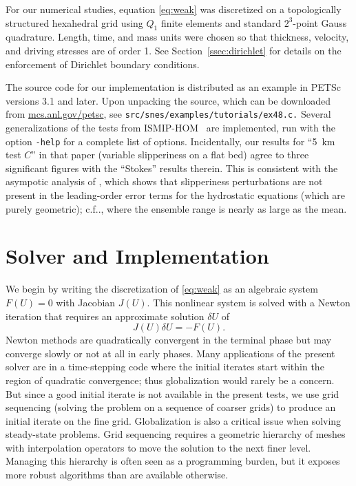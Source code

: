 \documentclass[draft,lineno,jgrga]{AGUTeX}
\makeatletter
\newcommand{\href}[1]{}
\DeclareRobustCommand\onedot{\futurelet\@let@token\@onedot}
\def\@onedot{\ifx\@let@token.\else.\null\fi\xspace}
\def\cf{{c.f}\onedot} \def\Cf{{C.f}\onedot}
\makeatother
\begin{document}
\begin{article}
For our numerical studies, equation \eqref{eq:weak} was discretized on a topologically structured hexahedral grid using $Q_1$ finite elements and standard $2^3$-point Gauss quadrature.  Length, time, and mass units were chosen so that thickness, velocity, and driving stresses are of order 1.  See Section~\ref{ssec:dirichlet} for details on the enforcement of Dirichlet boundary conditions.

The source code for our implementation is distributed as an example in PETSc~\citep{petsc-web-page} versions 3.1 and later.
Upon unpacking the source, which can be downloaded from \href{http://mcs.anl.gov/petsc}{\url{mcs.anl.gov/petsc}}, see \texttt{src/snes/examples/tutorials/ex48.c.}
Several generalizations of the tests from ISMIP-HOM~\citep{pattyn2008beh} are implemented, run with the option \texttt{-help} for a complete list of options.  Incidentally, our results for ``\SI{5}{\kilo\metre} test $C$'' in that paper (variable slipperiness on a flat bed) agree to three significant figures with the ``Stokes'' results therein.
This is consistent with the asympotic analysis of \cite{schoof2010thin}, which shows that slipperiness perturbations are not present in the leading-order error terms for the hydrostatic equations (which are purely geometric); \cf \cite[Table~4 and Figure~8]{pattyn2008beh}, where the ensemble range is nearly as large as the mean.

\section{Solver and Implementation}\label{sec:solver}
We begin by writing the discretization of \eqref{eq:weak} as an algebraic system $F(U) = 0$ with
Jacobian $J(U)$.  This nonlinear system is solved with a Newton iteration that requires an
approximate solution $\delta U$ of
\begin{equation}\label{eq:newton-step}
  J(U)\delta U = -F(U) .
\end{equation}
Newton methods are quadratically convergent in the terminal phase but may converge slowly or
not at all in early phases.  Many applications of the present solver are in a time-stepping code
where the initial iterates start within the region of quadratic convergence; thus globalization
would rarely be a concern. But since a good initial iterate is not available in the present tests,
we use grid sequencing (solving the problem on a sequence of coarser grids) to produce an initial
iterate on the fine grid.
Globalization is also a critical issue when solving steady-state problems.
Grid sequencing requires a geometric hierarchy of meshes with interpolation operators to move the solution to the next finer level.
Managing this hierarchy is often seen as a programming burden, but it exposes more robust algorithms than are available otherwise.


\end{article}
\end{document}
